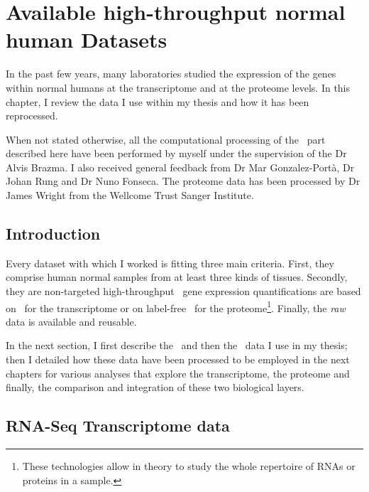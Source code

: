 \chapter{Available high-throughput normal human Datasets}
\label{ch:datasets}

\begin{comment}
\setlength{\epigraphwidth}{0.57\textwidth}
\setlength{\epigraphrule}{0.1pt}
\epigraph{Data! Data! Data! I can’t make bricks without clay!}{Sherlock Homes
    (Sir Arthur Conan Doyle)}
\end{comment}

In the past few years, many laboratories studied the expression
of the genes within normal humans at the transcriptome and at
the proteome levels. In this chapter, I review the data I use within my thesis
and how it has been reprocessed.

When not stated otherwise, all the computational processing of the \Rnaseq\ part
described here have been performed by myself under the supervision of
the Dr Alvis Brazma. I also received general feedback from Dr Mar Gonzalez-Portà,
Dr Johan Rung and Dr Nuno Fonseca. The proteome data has been processed by
Dr James Wright from the Wellcome Trust Sanger Institute.


\section{Introduction}

Every dataset with which I worked is fitting three main criteria.
First, they comprise human normal samples from at least three kinds of tissues.
Secondly, they are non-targeted high-throughput \ie\ gene expression
quantifications are based on \Rnaseq\ for the transcriptome or on label-free \ms\
for the proteome\footnote{These technologies allow in theory to study the whole
repertoire of \glspl{RNA} or proteins in a sample.}.
Finally, the \emph{raw} data is available and reusable.

In the next section, I first describe the \Rnaseq\ and then the \ms\ data I use
in my thesis; then I detailed how these data have been processed to be
employed in the next chapters for various analyses that explore the transcriptome,
the proteome and finally, the comparison and integration of these two
biological layers.


\section{RNA-Seq Transcriptome data}
\label{sec:rnaseq-data}

